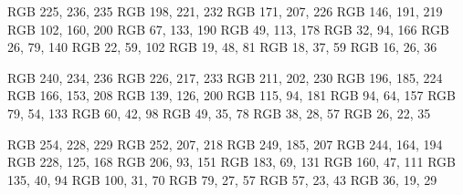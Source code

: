 \definecolor{blue50}  {RGB} {225, 236, 235}
\definecolor{blue100} {RGB} {198, 221, 232}
\definecolor{blue150} {RGB} {171, 207, 226}
\definecolor{blue200} {RGB} {146, 191, 219}
\definecolor{blue300} {RGB} {102, 160, 200}
\definecolor{blue400} {RGB} {67, 133, 190}
\definecolor{blue500} {RGB} {49, 113, 178}
\definecolor{blue600} {RGB} {32, 94, 166}
\definecolor{blue700} {RGB} {26, 79, 140}
\definecolor{blue800} {RGB} {22, 59, 102}
\definecolor{blue850} {RGB} {19, 48, 81}
\definecolor{blue900} {RGB} {18, 37, 59}
\definecolor{blue950} {RGB} {16, 26, 36}

\definecolor{purple50}  {RGB} {240, 234, 236}
\definecolor{purple100} {RGB} {226, 217, 233}
\definecolor{purple150} {RGB} {211, 202, 230}
\definecolor{purple200} {RGB} {196, 185, 224}
\definecolor{purple300} {RGB} {166, 153, 208}
\definecolor{purple400} {RGB} {139, 126, 200}
\definecolor{purple500} {RGB} {115, 94, 181}
\definecolor{purple600} {RGB} {94, 64, 157}
\definecolor{purple700} {RGB} {79, 54, 133}
\definecolor{purple800} {RGB} {60, 42, 98}
\definecolor{purple850} {RGB} {49, 35, 78}
\definecolor{purple900} {RGB} {38, 28, 57}
\definecolor{purple950} {RGB} {26, 22, 35}

\definecolor{magenta50}  {RGB} {254, 228, 229}
\definecolor{magenta100} {RGB} {252, 207, 218}
\definecolor{magenta150} {RGB} {249, 185, 207}
\definecolor{magenta200} {RGB} {244, 164, 194}
\definecolor{magenta300} {RGB} {228, 125, 168}
\definecolor{magenta400} {RGB} {206, 93, 151}
\definecolor{magenta500} {RGB} {183, 69, 131}
\definecolor{magenta600} {RGB} {160, 47, 111}
\definecolor{magenta700} {RGB} {135, 40, 94}
\definecolor{magenta800} {RGB} {100, 31, 70}
\definecolor{magenta850} {RGB} {79, 27, 57}
\definecolor{magenta900} {RGB} {57, 23, 43}
\definecolor{magenta950} {RGB} {36, 19, 29}